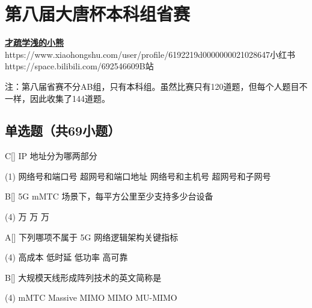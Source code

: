 \chapter{第八届大唐杯本科组省赛}
\fancyhead[R]{\color{H6}\kaishu\rightmark\,}

\date{2021年5月6日}{}{\href{https://github.com/xubenshan/dtcup}{\textbf{才疏学浅的小熊}}}
{}
{https://www.xiaohongshu.com/user/profile/6192219d0000000021028647}{小红书}
{https://space.bilibili.com/692546609}{B站}

\vspace{1em}
注：第八届省赛不分AB组，只有本科组。虽然比赛只有120道题，但每个人题目不一样，因此收集了144道题。

\section{单选题（共69小题）}



\begin{choice}{C}[]
    IP 地址分为哪两部分
    \begin{tasks}(1)
        \task 网络号和端口号
        \task 超网号和端口地址
        \task 网络号和主机号
        \task 超网号和子网号
    \end{tasks}
\end{choice}


\begin{choice}{B}[]
    5G mMTC 场景下，每平方公里至少支持多少台设备
    \begin{tasks}(4)
         万
         万
         万
    \end{tasks}
\end{choice}




\begin{choice}{A}[]
    下列哪项不属于 5G 网络逻辑架构关键指标
    \begin{tasks}(4)
        \task 高成本
        \task 低时延
        \task 低功率
        \task 高可靠
    \end{tasks}
\end{choice}




\begin{choice}{B}[]
    大规模天线形成阵列技术的英文简称是
    \begin{tasks}(4)
        \task mMTC
        \task Massive MIMO
        \task MIMO
        \task MU-MIMO
    \end{tasks}
\end{choice}



